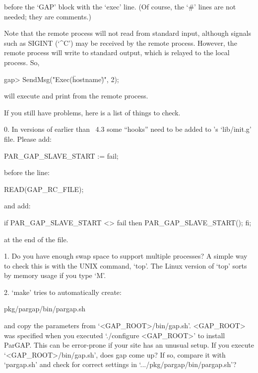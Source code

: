 before the `GAP' block with the `exec' line. (Of course, the  `\#'  lines
are not needed; they are comments.)

Note that the remote {\ParGAP} process will not read from standard input,
although signals such as SIGINT (`\^{}C') may be received by  the  remote
process. However, the remote {\ParGAP} process  will  write  to  standard
output, which is relayed to the local process. So,

\beginexample
gap> SendMsg("Exec(\"hostname\")", 2);
\endexample

will execute and print from the remote process.


If you still have problems, here is a list of things to check.

\beginlist
\item{0.}
    In  versions  of  {\GAP}  earlier  than  {\GAP}~4.3  some   {\ParGAP}
    ``hooks'' need to be added to {\GAP}'s `lib/init.g' file. Please add:

\begintt
PAR_GAP_SLAVE_START := fail;
\endtt

\item{}
    before the line:

\begintt
       READ(GAP_RC_FILE);
\endtt

\item{}
    and add:

\begintt
if PAR_GAP_SLAVE_START <> fail then PAR_GAP_SLAVE_START(); fi;
\endtt

\item{}
    at the end of the file.

\item{1.}
    Do you have enough swap space to support multiple {\GAP} processes? A
    simple way to check this is with the UNIX command, `top'.  The  Linux
    version of `top' sorts by memory usage if you type `M'.

\item{2.}
   `make' tries to automatically create:

\begintt
pkg/pargap/bin/pargap.sh
\endtt
       
\item{}
    and copy the parameters from `<GAP_ROOT>/bin/gap.sh'. <GAP_ROOT>  was
    specified when  you  executed  `./configure  <GAP_ROOT>'  to  install
    ParGAP. This can be error-prone if your site has an unusual setup. If
    you execute `<GAP_ROOT>/bin/gap.sh', does gap come up? If so, compare
    it   with   `pargap.sh'   and   check   for   correct   settings   in
    `.../pkg/pargap/bin/pargap.sh'?

